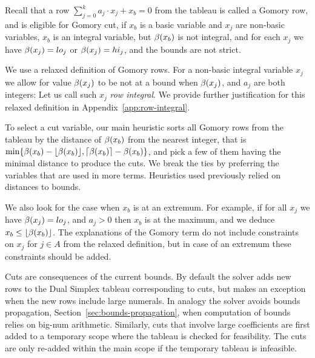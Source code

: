 Recall that a row $\sum_{j=0}^{k} a_j\cdot x_j + x_b = 0$ 
from the tableau is called a Gomory row, and is eligible for Gomory cut, if $x_b$ is a basic variable and $x_j$ are non-basic variables,
$x_b$ is an integral variable, but $\beta(x_b)$ is not integral, and for each $x_j$ we have $\beta(x_j) = lo_j$ or $\beta(x_j) = hi_j$,
and the bounds are not strict. 

We use a relaxed definition of Gomory rows. For a non-basic integral variable $x_j$ we allow for value $\beta(x_j)$ to be not at a bound when $\beta(x_j)$, and $a_j$ are both integers: Let us call such $x_j$ \emph{row integral}. We provide further justification for
this relaxed definition in Appendix~\ref{app:row-integral}.


To select a cut variable, our main heuristic sorts all Gomory rows from the tableau by the distance of $\beta(x_b)$ from the nearest integer, that is $\min \{ {\beta(x_b)-\lfloor \beta(x_b) \rfloor, \lceil \beta(x_b) \rceil - \beta(x_b)} \}$, and pick a few of them having the minimal distance to produce the cuts. We break the ties by preferring the variables that are used in more terms.
Heuristics used previously relied on distances to bounds.

We also look for the case when $x_b$ is at an extremum. For example, if for all $x_j$ we have $\beta(x_j) = lo_j$,
and $a_j > 0$ then $x_b$ is at the maximum, and we deduce $x_b \leq \lfloor \beta(x_b) \rfloor$.
The explanations of the Gomory term do not include constraints on $x_j$ for $j \in A$ from the relaxed definition,
but in case of an extremum these constraints should be added.


Cuts are consequences of the current bounds. By default the solver adds new rows to the Dual Simplex tableau corresponding to cuts,
but makes an exception when the new rows include large numerals.
In analogy the solver avoids bounds propagation, Section~\ref{sec:bounds-propagation},
when computation of bounds relies on big-num arithmetic.
Similarly, cuts that involve large coefficients are first added to a temporary scope where the tableau is checked for feasibility.
The cuts are only re-added within the main scope if the temporary tableau is infeasible.

